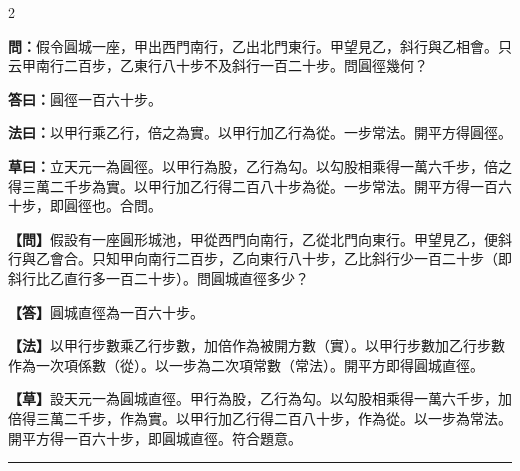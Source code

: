 \documentclass[11pt,a4paper]{article}
\newcommand{\longline}{\noindent\rule{\textwidth}{0.4pt}}
\newcommand{\wenC}[1]{\par\noindent\textbf{\textcolor{probcolor}{問：}}{#1}\par}
\newcommand{\daC}[1]{\par\noindent\textbf{\textcolor{anscolor}{答曰：}}{#1}\par}
\newcommand{\fayueC}[1]{\par\noindent\textbf{\textcolor{methodcolor}{法曰：}}{#1}\par}
\newcommand{\caoyueC}[1]{\par\noindent\textbf{草曰：}{#1}\par}
\newcommand{\wenM}[1]{\par\noindent\textbf{\textcolor{probcolor}{【問】}}{#1}\par}
\newcommand{\daM}[1]{\par\noindent\textbf{\textcolor{anscolor}{【答】}}{#1}\par}
\newcommand{\fayueM}[1]{\par\noindent\textbf{\textcolor{methodcolor}{【法】}}{#1}\par}
\newcommand{\caoyueM}[1]{\par\noindent\textbf{【草】}{#1}\par}
\begin{document}
\begin{paracol}{2}

\wenC{假令圓城一座，甲出西門南行，乙出北門東行。甲望見乙，斜行與乙相會。只云甲南行二百步，乙東行八十步不及斜行一百二十步。問圓徑幾何？}

\daC{圓徑一百六十步。}

\fayueC{以甲行乘乙行，倍之為實。以甲行加乙行為從。一步常法。開平方得圓徑。}

\caoyueC{立天元一為圓徑。以甲行為股，乙行為勾。以勾股相乘得一萬六千步，倍之得三萬二千步為實。以甲行加乙行得二百八十步為從。一步常法。開平方得一百六十步，即圓徑也。合問。}

\switchcolumn

\wenM{假設有一座圓形城池，甲從西門向南行，乙從北門向東行。甲望見乙，便斜行與乙會合。只知甲向南行二百步，乙向東行八十步，乙比斜行少一百二十步（即斜行比乙直行多一百二十步）。問圓城直徑多少？}

\daM{圓城直徑為一百六十步。}

\fayueM{以甲行步數乘乙行步數，加倍作為被開方數（實）。以甲行步數加乙行步數作為一次項係數（從）。以一步為二次項常數（常法）。開平方即得圓城直徑。}

\caoyueM{設天元一為圓城直徑。甲行為股，乙行為勾。以勾股相乘得一萬六千步，加倍得三萬二千步，作為實。以甲行加乙行得二百八十步，作為從。以一步為常法。開平方得一百六十步，即圓城直徑。符合題意。}

\end{paracol}

\vspace{0.3cm}
\longline
\end{document}
